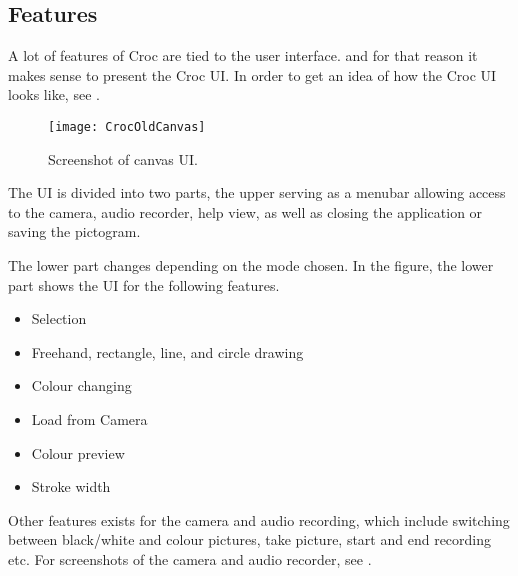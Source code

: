 \subsection{Features}
A lot of features of Croc are tied to the user interface. and for that reason it makes sense to present the Croc UI.
In order to get an idea of how the Croc UI looks like, see . 

\begin{figure}[h]
     \centering
     \texttt{[image: CrocOldCanvas]}
     \caption{Screenshot of canvas UI.}
     \label{fig:croc-old-canvas}
\end{figure}

The UI is divided into two parts, the upper serving as a menubar allowing access to the camera, audio recorder, help view, as well as closing the application or saving the pictogram.

The lower part changes depending on the mode chosen.
In the figure, the lower part shows the UI for the following features.

\begin{itemize}
     \item Selection
     \item Freehand, rectangle, line, and circle drawing
     \item Colour changing
     \item Load from Camera
     \item Colour preview
     \item Stroke width
\end{itemize}

Other features exists for the camera and audio recording, which include switching between black/white and colour pictures, take picture, start and end recording etc.
For screenshots of the camera and audio recorder, see .


